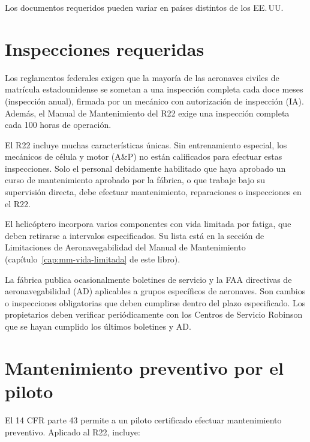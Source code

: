 \begin{nota}
Los documentos requeridos pueden variar en países distintos de los EE.\,UU.
\end{nota}

\section{Inspecciones requeridas}

Los reglamentos federales exigen que la mayoría de las aeronaves civiles de matrícula estadounidense se sometan a una inspección completa cada doce meses (inspección anual), firmada por un mecánico con autorización de inspección (IA). Además, el Manual de Mantenimiento del R22 exige una inspección completa cada 100 horas de operación.

El R22 incluye muchas características únicas. Sin entrenamiento especial, los mecánicos de célula y motor (A\&P) no están calificados para efectuar estas inspecciones. Solo el personal debidamente habilitado que haya aprobado un curso de mantenimiento aprobado por la fábrica, o que trabaje bajo su supervisión directa, debe efectuar mantenimiento, reparaciones o inspecciones en el R22.

El helicóptero incorpora varios componentes con vida limitada por fatiga, que deben retirarse a intervalos especificados. Su lista está en la sección de Limitaciones de Aeronavegabilidad del Manual de Mantenimiento (capítulo~\ref{cap:mm-vida-limitada} de este libro).

La fábrica publica ocasionalmente boletines de servicio y la FAA directivas de aeronavegabilidad (AD) aplicables a grupos específicos de aeronaves. Son cambios o inspecciones obligatorias que deben cumplirse dentro del plazo especificado. Los propietarios deben verificar periódicamente con los Centros de Servicio Robinson que se hayan cumplido los últimos boletines y AD.

\section{Mantenimiento preventivo por el piloto}

El 14 CFR parte 43 permite a un piloto certificado efectuar mantenimiento preventivo. Aplicado al R22, incluye:

